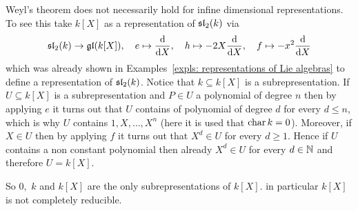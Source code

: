 \begin{remark}
 Weyl’s theorem does not necessarily hold for infine dimensional representations. To see this take $k[X]$ as a representation of $\mathfrak{sl}_2(k)$ via
 \[
  \mathfrak{sl}_2(k) \to \mathfrak{gl}(k[X]), \quad
  e \mapsto \frac{\text{d}}{\text{d}X}, \quad
  h \mapsto -2X\frac{\text{d}}{\text{d}X}, \quad
  f \mapsto -x^2\frac{\text{d}}{\text{d}X}
 \]
 which was already shown in Examples~\ref{expls: representations of Lie algebras} to define a representation of $\mathfrak{sl}_2(k)$. Notice that $k \subseteq k[X]$ is a subrepresentation. If $U \subseteq k[X]$ is a subrepresentation and $P \in U$ a polynomial of degree $n$ then by applying $e$ it turns out that $U$ contains of polynomial of degree $d$ for every $d \leq n$, which is why $U$ contains $1, X, \dotsc, X^n$ (here it is used that $\operatorname{char} k = 0$). Moreover, if $X \in U$ then by applying $f$ it turns out that $X^d \in U$ for every $d \geq 1$. Hence if $U$ contains a non constant polynomial then already $X^d \in U$ for every $d \in \mathbb{N}$ and therefore $U = k[X]$.
 
 So $0,$ $k$ and $k[X]$ are the only subrepresentations of $k[X]$. in particular $k[X]$ is not completely reducible.
\end{remark}




